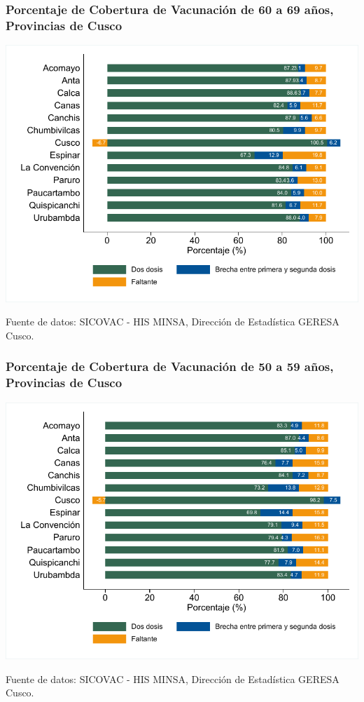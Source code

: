 \documentclass[xcolor=table]{beamer}
\begin{document}
\begin{frame}[label=vacunas_60]
	\frametitle{Porcentaje de Cobertura de Vacunación de 60 a 69 años, Provincias de Cusco}
	\vspace{-.5cm}
	\begin{center}
		\includegraphics[width=0.8\linewidth, trim={.2cm .5cm .2cm .2cm},clip]{../figuras/vacunacion_provincial_edad_7.pdf}
	\end{center}
	{\tiny Fuente de datos: SICOVAC - HIS MINSA, Dirección de Estadística GERESA Cusco. \\}
	\hyperlink{cobertura_vacuna_provincias}{}
\end{frame}

\begin{frame}[label=vacunas_50]
	\frametitle{Porcentaje de Cobertura de Vacunación de 50 a 59 años, Provincias de Cusco}
	\vspace{-.5cm}
	\begin{center}
		\includegraphics[width=0.8\linewidth, trim={.2cm .5cm .2cm .2cm},clip]{../figuras/vacunacion_provincial_edad_6.pdf}
	\end{center}
	{\tiny Fuente de datos: SICOVAC - HIS MINSA, Dirección de Estadística GERESA Cusco. \\}
\hyperlink{cobertura_vacuna_provincias}{}
\end{frame}
\end{document}

